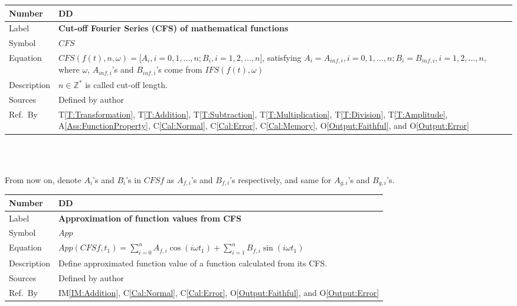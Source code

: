 \documentclass[12pt]{article}
\newcommand{\colAwidth}{0.13\textwidth}
\newcommand{\colBwidth}{0.82\textwidth}
\newcounter{defnum} %
\newcounter{datadefnum} %
\newcommand{\tref}[1]{T\ref{#1}}
\newcommand{\aref}[1]{A\ref{#1}}
\newcommand{\calref}[1]{C\ref{#1}}
\newcommand{\oref}[1]{O\ref{#1}}
\newcommand{\iref}[1]{IM\ref{#1}}
\begin{document}
\noindent
\begin{minipage}{\textwidth}
	\renewcommand*{\arraystretch}{1.5}
	\begin{tabular}{| p{\colAwidth} | p{\colBwidth}|}
		\hline
		\rowcolor[gray]{0.9}
		Number& DD{datadefnum}\thedatadefnum \label{DD:CFS}\\
		\hline
		Label& \bf Cut-off Fourier Series (CFS) of mathematical functions\\
		\hline
		Symbol &$\mathit{CFS}$\\
		\hline
		Equation&$\mathit{CFS}(f(t), n, \omega)=\big[A_i, i=0, 1, ..., n; 
		B_i, i=1, 2, ..., n\big]$, satisfying $A_i=A_{inf, i}, i=0, 1, ..., n; 
		B_i=B_{inf, i}, i=1, 2, ..., n$, where 
		$\omega$, $A_{inf, i}$'s 
		and $B_{inf, i}$'s come from $\mathit{IFS}(f(t), \omega)$ \\
		\hline
		Description & $n\in \mathbb{Z}^{*}$ is called cut-off length.\\
		\hline
		Sources& Defined by author\\
		\hline
		Ref.\ By & \tref{T:Transformation}, \tref{T:Addition}, 
		\tref{T:Subtraction}, \tref{T:Multiplication}, 
		\tref{T:Division}, \tref{T:Amplitude}, 
		\aref{Ass:FunctionProperty},  \calref{Cal:Normal}, 
		\calref{Cal:Error}, \calref{Cal:Memory}, 
		\oref{Output:Faithful}, and \oref{Output:Error}\\
		\hline
	\end{tabular}
\end{minipage}\\
~\newline

From now on, denote $A_i$'s and $B_i$'s in $\mathit{CFSf}$ 
as $A_{f, i}$'s and $B_{f, i}$'s respectively, and same for 
$A_{g, i}$'s and $B_{g, i}$'s.
~\newline

\noindent
\begin{minipage}{\textwidth}
	\renewcommand*{\arraystretch}{1.5}
	\begin{tabular}{| p{\colAwidth} | p{\colBwidth}|}
		\hline
		\rowcolor[gray]{0.9}
		Number& DD{datadefnum}\thedatadefnum 
		\label{DD:Approximation}\\
		\hline
		Label& \bf Approximation of function values from CFS\\
		\hline
		Symbol &$\mathit{App}$\\
		\hline
		Equation& $\mathit{App}(\mathit{CFSf}, t_1)=\sum_{i=0}^{n}A_{f,i}\cos(i\omega t_1)+
		\sum_{i=1}^{n}B_{f,i}\sin(i\omega t_1)$ \\
		\hline
		Description & Define approximated function value of a function 
		calculated from its CFS.\\
		\hline
		Sources& Defined by author\\
		\hline
		Ref.\ By & \iref{IM:Addition}, \calref{Cal:Normal}, 
		\calref{Cal:Error}, \oref{Output:Faithful}, and \oref{Output:Error}\\
		\hline
	\end{tabular}
\end{minipage}\\
~\newline
\end{document}
